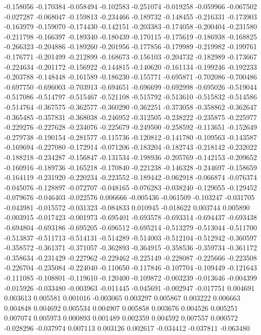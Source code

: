 -0.158056
-0.170384
-0.058494
-0.102583
-0.251074
-0.019258
-0.059966
-0.067502
-0.027287
-0.068047
-0.159813
-0.234466
-0.189732
-0.148455
-0.216331
-0.173903
-0.163979
-0.159070
-0.174430
-0.142151
-0.203383
-0.174058
-0.200404
-0.231580
-0.211798
-0.166397
-0.189340
-0.180439
-0.170115
-0.175619
-0.186938
-0.168825
-0.266323
-0.204886
-0.189260
-0.201956
-0.177856
-0.179989
-0.219982
-0.199761
-0.176771
-0.201499
-0.212899
-0.168673
-0.156103
-0.204732
-0.182989
-0.173667
-0.224634
-0.201172
-0.156922
-0.144815
-0.140620
-0.161134
-0.199246
-0.192233
-0.203788
-0.148448
-0.161589
-0.186230
-0.155771
-0.695871
-0.702086
-0.700486
-0.697750
-0.696003
-0.703913
-0.694651
-0.696699
-0.692998
-0.695026
-0.519044
-0.517086
-0.514797
-0.515467
-0.521108
-0.515792
-0.513610
-0.515832
-0.514586
-0.514764
-0.367575
-0.362577
-0.360290
-0.362251
-0.373058
-0.358862
-0.362647
-0.365485
-0.357831
-0.368038
-0.246952
-0.312505
-0.238222
-0.235875
-0.225977
-0.229276
-0.227628
-0.234076
-0.225679
-0.249500
-0.258592
-0.113651
-0.152649
-0.279738
-0.190154
-0.281577
-0.115736
-0.120812
-0.141780
-0.109563
-0.143587
-0.169694
-0.227080
-0.172914
-0.071206
-0.183204
-0.182743
-0.218142
-0.232022
-0.188218
-0.234287
-0.156847
-0.131534
-0.198936
-0.205769
-0.142153
-0.209652
-0.160916
-0.189736
-0.165218
-0.170840
-0.221238
-0.146328
-0.244697
-0.158659
-0.164119
-0.231920
-0.220234
-0.223552
-0.189442
-0.062918
-0.066874
-0.076374
-0.045076
-0.128897
-0.072707
-0.048165
-0.076283
-0.038240
-0.129055
-0.129452
-0.079676
-0.046403
-0.022576
0.006666
-0.005436
-0.061509
-0.103247
-0.031705
-0.043981
-0.015572
-0.031323
-0.084833
0.010945
-0.018622
0.003744
0.005890
-0.003915
-0.017423
-0.001973
-0.695401
-0.693578
-0.693314
-0.694437
-0.693438
-0.694804
-0.693186
-0.695205
-0.696512
-0.695214
-0.513279
-0.513044
-0.511700
-0.513837
-0.511713
-0.514131
-0.514289
-0.514003
-0.512104
-0.512942
-0.360597
-0.358572
-0.361371
-0.371057
-0.362893
-0.364915
-0.358536
-0.359734
-0.361172
-0.358634
-0.231429
-0.227962
-0.229462
-0.225149
-0.228087
-0.225666
-0.223508
-0.226704
-0.235084
-0.224040
-0.110650
-0.117846
-0.107704
-0.109449
-0.121643
-0.111085
-0.108801
-0.119610
-0.120400
-0.109872
-0.003239
-0.013646
-0.004399
-0.015926
-0.033480
-0.003963
-0.011445
-0.045691
-0.002947
-0.017751
0.004691
0.003613
0.005581
0.001016
-0.003065
0.003297
0.005867
0.003222
0.006663
0.004848
0.004692
0.005534
0.004907
0.005858
0.003676
0.004526
0.005251
0.007074
0.005973
0.000893
0.001489
0.002359
0.004592
0.007557
0.000572
-0.028296
-0.037974
0.007113
0.003126
0.002617
-0.034412
-0.037811
-0.063480
